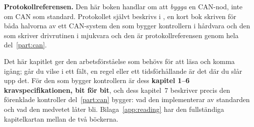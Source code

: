 \begin{aside}
\textbf{Protokollreferensen.} Den här boken handlar om att \emph{bygga} en CAN-nod, inte om CAN som
standard. Protokollet självt beskrivs i \canbook, en kort bok skriven för båda halvorna av ett
CAN-system \textemdash{} den som bygger kontrollern i hårdvara och den som skriver drivrutinen i
mjukvara \textemdash{} och den är protokollreferensen genom hela del~\ref{part:can}.

Det här kapitlet ger den arbetsförståelse som behövs för att läsa  och komma igång;
går du vilse i ett fält, en regel eller ett tidsförhållande är det där du slår upp det. För den som
bygger kontrollern är dess \textbf{kapitel 1--6 kravspecifikationen, bit för bit}, och dess
kapitel~7 beskriver precis den förenklade kontroller del~\ref{part:can} bygger: vad den
implementerar av standarden och vad den medvetet låter bli. Bilaga~\ref{app:reading} har den
fullständiga kapitelkartan mellan de två böckerna.
\end{aside}






